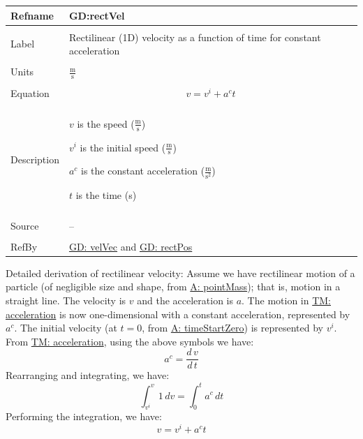 \documentclass[12pt]{article}
\begin{document}
\noindent \begin{minipage}{\textwidth}
\begin{tabular}{p{} p{}}
\toprule \textbf{Refname} & \textbf{GD:rectVel}
\label{GD:rectVel}
\\ \midrule \\
Label & Rectilinear (1D) velocity as a function of time for constant acceleration
\\ \midrule \\
Units & $\frac{\text{m}}{\text{s}}$
\\ \midrule \\
Equation & \begin{displaymath}
           v={v^{i}}+{a^{c}} t
           \end{displaymath}
\\ \midrule \\
Description & \begin{symbDescription}
              \item{$v$ is the speed ($\frac{\text{m}}{\text{s}}$)}
              \item{${v^{i}}$ is the initial speed ($\frac{\text{m}}{\text{s}}$)}
              \item{${a^{c}}$ is the constant acceleration ($\frac{\text{m}}{\text{s}^{2}}$)}
              \item{$t$ is the time (s)}
              \end{symbDescription}
\\ \midrule \\
Source & --
\\ \midrule \\
RefBy & \hyperref[GD:velVec]{GD: velVec} and \hyperref[GD:rectPos]{GD: rectPos}
\\ \bottomrule \end{tabular}
\end{minipage}
Detailed derivation of rectilinear velocity:
Assume we have rectilinear motion of a particle (of negligible size and shape, from \hyperref[pointMass]{A: pointMass}); that is, motion in a straight line. The velocity is $v$ and the acceleration is $a$. The motion in \hyperref[TM:acceleration]{TM: acceleration} is now one-dimensional with a constant acceleration, represented by ${a^{c}}$. The initial velocity (at $t=0$, from \hyperref[timeStartZero]{A: timeStartZero}) is represented by ${v^{i}}$. From \hyperref[TM:acceleration]{TM: acceleration}, using the above symbols we have:
\begin{displaymath}
{a^{c}}=\frac{d\,v}{d\,t}
\end{displaymath}
Rearranging and integrating, we have:
\begin{displaymath}
\int_{{v^{i}}}^{v}{1}\,dv=\int_{0}^{t}{{a^{c}}}\,dt
\end{displaymath}
Performing the integration, we have:
\begin{displaymath}
v={v^{i}}+{a^{c}} t
\end{displaymath}
\par~
\end{document}
